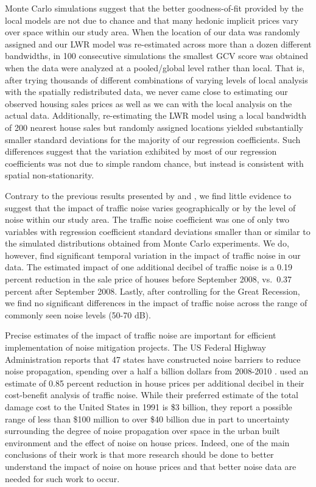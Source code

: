 \documentclass{article}\usepackage{graphicx, color}
\begin{document}
Monte Carlo simulations suggest that the better goodness-of-fit provided by the local models are not due to chance and that many hedonic implicit prices vary over space within our study area. When the location of our data was randomly assigned and our LWR model was re-estimated across more than a dozen different bandwidths, in 100 consecutive simulations the smallest GCV score was obtained when the data were analyzed at a pooled/global level rather than local. That is, after trying thousands of different combinations of varying levels of local analysis with the spatially redistributed data, we never came close to estimating our observed housing sales prices as well as we can with the local analysis on the actual data. Additionally, re-estimating the LWR model using a local bandwidth of 200 nearest house sales but randomly assigned locations yielded substantially smaller standard deviations for the majority of our regression coefficients. Such differences suggest that the variation exhibited by most of our regression coefficients was not due to simple random chance, but instead is consistent with spatial non-stationarity. 

Contrary to the previous results presented by \citet{MarmolejoDuarteCarlos;GonzalezTamez2009} and \citet{Theebe2004a}, we find little evidence to suggest that the impact of traffic noise varies geographically or by the level of noise within our study area. The traffic noise coefficient was one of only two variables with regression coefficient standard deviations smaller than or similar to the simulated distributions obtained from Monte Carlo experiments. We do, however, find significant temporal variation in the impact of traffic noise in our data. The estimated impact of one additional decibel of traffic noise is a 0.19 percent reduction in the sale price of houses before September 2008, vs.\ 0.37 percent after September 2008. Lastly, after controlling for the Great Recession, we find no significant differences in the impact of traffic noise across the range of commonly seen noise levels (50-70 dB).

Precise estimates of the impact of traffic noise are important for efficient implementation of noise mitigation projects. The US Federal Highway Administration reports that 47 states have constructed noise barriers to reduce noise propagation, spending over a half a billion dollars from 2008-2010 . \citet{Delucchi1998} used an estimate of 0.85 percent reduction in house prices per additional decibel in their cost-benefit analysis of traffic noise. While their preferred estimate of the total damage cost to the United States in 1991 is \$3 billion, they report a possible range of less than \$100 million to over \$40 billion due in part to uncertainty surrounding the degree of noise propagation over space in the urban built environment and the effect of noise on house prices. Indeed, one of the main conclusions of their work is that more research should be done to better understand the impact of noise on house prices and that better noise data are needed for such work to occur. 
\end{document}
